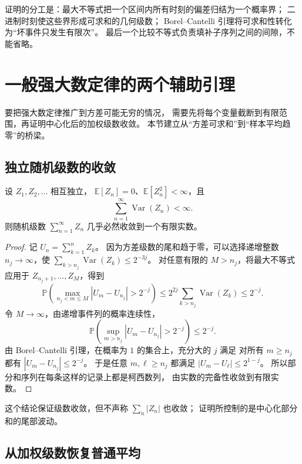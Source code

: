 \documentclass[UTF8]{ctexart}
\begin{document}
证明的分工是：最大不等式把一个区间内所有时刻的偏差归结为一个概率界；
二进制时刻使这些界形成可求和的几何级数；
Borel--Cantelli 引理将可求和性转化为“坏事件只发生有限次”。
最后一个比较不等式负责填补子序列之间的间隙，不能省略。

\section{一般强大数定律的两个辅助引理}
\label{sec:lln-series-tools}

要把强大数定律推广到方差可能无穷的情况，
需要先将每个变量截断到有限范围，再证明中心化后的加权级数收敛。
本节建立从“方差可求和”到“样本平均趋零”的桥梁。

\subsection{独立随机级数的收敛}

\begin{lemma}[方差可求和保证中心化级数收敛]
\label{lem:lln-series-convergence}
设 $Z_1,Z_2,\ldots$ 相互独立，
$\mathbb E[Z_n]=0$、$\mathbb E[Z_n^2]<\infty$，且
\[
  \sum_{n=1}^\infty\operatorname{Var}(Z_n)<\infty.
\]
则随机级数 $\sum_{n=1}^\infty Z_n$ 几乎必然收敛到一个有限实数。
\end{lemma}

\begin{proof}
记 $U_n=\sum_{k=1}^nZ_k$。
因为方差级数的尾和趋于零，可以选择递增整数 $n_j\to\infty$，使
$\sum_{k>n_j}\operatorname{Var}(Z_k)\leq2^{-3j}$。
对任意有限的 $M>n_j$，将最大不等式应用于
$Z_{n_j+1},\ldots,Z_M$，得到
\[
  \mathbb P\left(
    \max_{n_j<m\leq M}|U_m-U_{n_j}|>2^{-j}
  \right)
  \leq 2^{2j}\sum_{k>n_j}\operatorname{Var}(Z_k)
  \leq2^{-j}.
\]
令 $M\to\infty$，由递增事件列的概率连续性，
\[
  \mathbb P\left(
    \sup_{m>n_j}|U_m-U_{n_j}|>2^{-j}
  \right)\leq2^{-j}.
\]
由 Borel--Cantelli 引理，在概率为 $1$ 的集合上，充分大的 $j$ 满足
对所有 $m\geq n_j$ 都有 $|U_m-U_{n_j}|\leq2^{-j}$。
于是任意 $m,\ell\geq n_j$ 都满足
$|U_m-U_\ell|\leq2^{1-j}$。
所以部分和序列在每条这样的记录上都是柯西数列，
由实数的完备性收敛到有限实数。
\end{proof}

这个结论保证级数收敛，但不声称 $\sum_n|Z_n|$ 也收敛；
证明所控制的是中心化部分和的尾部波动。

\subsection{从加权级数恢复普通平均}
\end{document}
